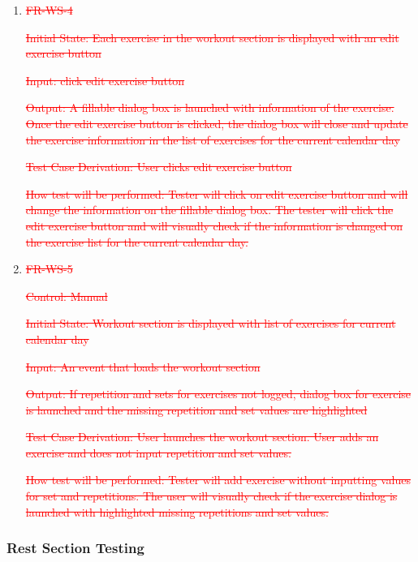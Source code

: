 \documentclass[12pt, titlepage]{article}
\begin{document}
\begin{enumerate}
\item{\textcolor{red}{\sout{FR-WS-4}}\\}

\textcolor{red}{\sout{Initial State: Each exercise in the workout section is displayed with an edit exercise button}}

\textcolor{red}{\sout{Input: click edit exercise button}}

\textcolor{red}{\sout{Output: A fillable dialog box is launched with information of the exercise. Once the edit exercise button is clicked, the dialog box will close and update the exercise information in the list of exercises for the current calendar day}}

\textcolor{red}{\sout{Test Case Derivation: User clicks edit exercise button}}

\textcolor{red}{\sout{How test will be performed: Tester will click on edit exercise button and will change the information on the fillable dialog box. The tester will click the edit exercise button and will visually check if the information is changed on the exercise list for the current calendar day.}}

\item{\textcolor{red}{\sout{FR-WS-5}}\\}

\textcolor{red}{\sout{Control: Manual}}

\textcolor{red}{\sout{Initial State: Workout section is displayed with list of exercises for current calendar day}}

\textcolor{red}{\sout{Input: An event that loads the workout section}}

\textcolor{red}{\sout{Output: If repetition and sets for exercises not logged, dialog box for exercise is launched and the missing repetition and set values are highlighted}}

\textcolor{red}{\sout{Test Case Derivation: User launches the workout section. User adds an exercise and does not input repetition and set values.}}

\textcolor{red}{\sout{How test will be performed: Tester will add exercise without inputting values for set and repetitions. The user will visually check if the exercise dialog is launched with highlighted missing repetitions and set values.}}
	
\end{enumerate}


\subsubsection{Rest Section Testing}
\end{document}
